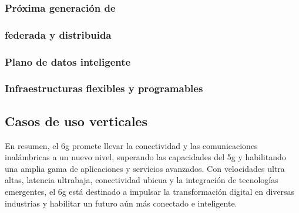 \subsubsection{Próxima generación de }

\subsubsection{ federada y distribuida}
 
\subsubsection{Plano de datos inteligente}

\subsubsection{Infraestructuras flexibles y programables }
   



\subsection{Casos de uso verticales}



En resumen, el \gls{6g} promete llevar la conectividad y las comunicaciones inalámbricas a un nuevo nivel, superando las capacidades del \gls{5g} y habilitando una amplia gama de aplicaciones y servicios avanzados. Con velocidades ultra altas, latencia ultrabaja, conectividad ubicua y la integración de tecnologías emergentes, el \gls{6g} está destinado a impulsar la transformación digital en diversas industrias y habilitar un futuro aún más conectado e inteligente.

